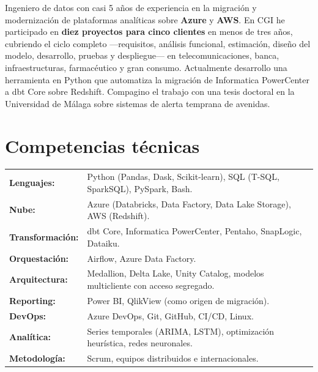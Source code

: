 \documentclass[10pt]{article}
\begin{document}
\pagestyle{others}\thispagestyle{first_page}

\newcommand{\experience}[4]{
    \textbf{#1} \hfill #2 \\
    \textit{#3} \hfill #4 \\
}

\newcommand{\cliente}[2]{
    \vspace{0.15cm}
    \textbf{#1} \hfill \textit{#2} \\
    \vspace{-0.2cm}
}

\begingroup
\justifying
Ingeniero de datos con casi 5 años de experiencia en la migración y modernización de plataformas analíticas sobre \textbf{Azure} y \textbf{AWS}. En CGI he participado en \textbf{diez proyectos para cinco clientes} en menos de tres años, cubriendo el ciclo completo —requisitos, análisis funcional, estimación, diseño del modelo, desarrollo, pruebas y despliegue— en telecomunicaciones, banca, infraestructuras, farmacéutico y gran consumo. Actualmente desarrollo una herramienta en Python que automatiza la migración de Informatica PowerCenter a dbt Core sobre Redshift. Compagino el trabajo con una tesis doctoral en la Universidad de Málaga sobre sistemas de alerta temprana de avenidas.
\par
\endgroup

\section{Competencias técnicas}

\begin{tabular}{p{} p{}}
\textbf{Lenguajes:} & Python (Pandas, Dask, Scikit-learn), SQL (T-SQL, SparkSQL), PySpark, Bash. \\
\textbf{Nube:} & Azure (Databricks, Data Factory, Data Lake Storage), AWS (Redshift). \\
\textbf{Transformación:} & dbt Core, Informatica PowerCenter, Pentaho, SnapLogic, Dataiku. \\
\textbf{Orquestación:} & Airflow, Azure Data Factory. \\
\textbf{Arquitectura:} & Medallion, Delta Lake, Unity Catalog, modelos multicliente con acceso segregado. \\
\textbf{Reporting:} & Power BI, QlikView (como origen de migración). \\
\textbf{DevOps:} & Azure DevOps, Git, GitHub, CI/CD, Linux. \\
\textbf{Analítica:} & Series temporales (ARIMA, LSTM), optimización heurística, redes neuronales. \\
\textbf{Metodología:} & Scrum, equipos distribuidos e internacionales. \\
\end{tabular}
\end{document}
